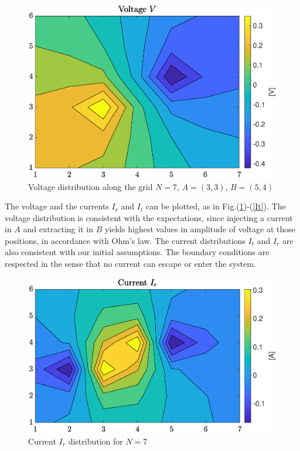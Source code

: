 \documentclass{article}
\begin{document}
\begin{spacing}{1.1}
\begin{figure}[H]
            \centering
            \includegraphics[scale=0.45]{voltage.eps} 
            \caption{\label{voltage}Voltage distribution along the grid $N=7$, $A=(3,3)$, $B=(5,4)$}
 \end{figure}
 
 The voltage and the currents $I_r$ and $I_t$ can be plotted, as in Fig.(\ref{voltage})-(\ref{It}). The voltage distribution is consistent with the expectations, since injecting a current in $A$ and extracting it in $B$ yields highest values in amplitude of voltage at those positions, in accordance with Ohm's law. The current distributions $I_t$ and $I_r$ are also consistent  with our initial assumptions. The boundary conditions are respected in the sense that no current can escape or enter the system.\\


\begin{figure}[H]
            \centering
            \includegraphics[scale=0.45]{Ir.eps} 
            \caption{\label{Ir}Current $I_r$ distribution for $N=7$}
 \end{figure}


\end{spacing}
\end{document}
